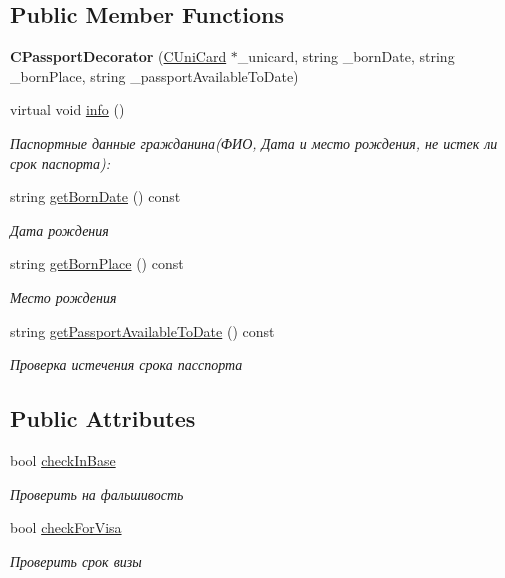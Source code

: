 \subsection*{Public Member Functions}
\begin{DoxyCompactItemize}
\item 
\mbox{\label{classCPassportDecorator_aa43bccb88ac663e1a36d85c567ab5076}} 
{\bfseries C\+Passport\+Decorator} (\hyperlink{classCUniCard}{C\+Uni\+Card} $\ast$\+\_\+unicard, string \+\_\+born\+Date, string \+\_\+born\+Place, string \+\_\+passport\+Available\+To\+Date)
\item 
virtual void \hyperlink{classCPassportDecorator_aec16f6c3f9feaa6da4d8cef5ea27c7b8}{info} ()
\begin{DoxyCompactList}\small\item\em Паспортные данные гражданина(ФИО, Дата и место рождения, не истек ли срок паспорта)\+: \end{DoxyCompactList}\item 
string \hyperlink{classCPassportDecorator_a116ab0fa075e02edb74339e2e1cd3389}{get\+Born\+Date} () const
\begin{DoxyCompactList}\small\item\em Дата рождения \end{DoxyCompactList}\item 
string \hyperlink{classCPassportDecorator_a941e597cc2514d8397030eab58682aa6}{get\+Born\+Place} () const
\begin{DoxyCompactList}\small\item\em Место рождения \end{DoxyCompactList}\item 
string \hyperlink{classCPassportDecorator_a96c55b65b042d4294d6cba471a936574}{get\+Passport\+Available\+To\+Date} () const
\begin{DoxyCompactList}\small\item\em Проверка истечения срока пасспорта \end{DoxyCompactList}\end{DoxyCompactItemize}
\subsection*{Public Attributes}
\begin{DoxyCompactItemize}
\item 
bool \hyperlink{classCPassportDecorator_a972d9fe88105ba06ec5bab01e230b1a8}{check\+In\+Base}
\begin{DoxyCompactList}\small\item\em Проверить на фальшивость \end{DoxyCompactList}\item 
bool \hyperlink{classCPassportDecorator_a2497ce4827a91e25a28756a56a8ba245}{check\+For\+Visa}
\begin{DoxyCompactList}\small\item\em Проверить срок визы \end{DoxyCompactList}\end{DoxyCompactItemize}


